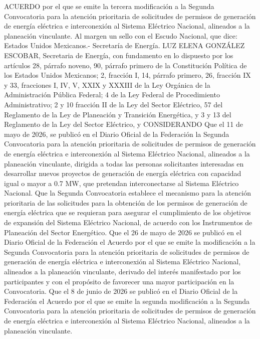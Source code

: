 \begingroup
\senertexto
ACUERDO por el que se emite la tercera modificación a la Segunda Convocatoria para la atención prioritaria de solicitudes de permisos de generación de energía eléctrica e interconexión al Sistema Eléctrico Nacional, alineados a la planeación vinculante.
Al margen un sello con el Escudo Nacional, que dice: Estados Unidos Mexicanos.- Secretaría de Energía.
LUZ ELENA GONZÁLEZ ESCOBAR, Secretaria de Energía, con fundamento en lo dispuesto por los artículos 28, párrafo noveno, 90, párrafo primero de la Constitución Política de los Estados Unidos Mexicanos; 2, fracción I, 14, párrafo primero, 26, fracción IX y 33, fracciones I, IV, V, XXIX y XXXIII de la Ley Orgánica de la Administración Pública Federal; 4 de la Ley Federal de Procedimiento Administrativo; 2 y 10 fracción II de la Ley del Sector Eléctrico, 57 del Reglamento de la Ley de Planeación y Transición Energética, y 3 y 13 del Reglamento de la Ley del Sector Eléctrico, y
CONSIDERANDO
Que el 11 de mayo de 2026, se publicó en el Diario Oficial de la Federación la Segunda Convocatoria para la atención prioritaria de solicitudes de permisos de generación de energía eléctrica e interconexión al Sistema Eléctrico Nacional, alineados a la planeación vinculante, dirigida a todas las personas solicitantes interesadas en desarrollar nuevos proyectos de generación de energía eléctrica con capacidad igual o mayor a 0.7 MW, que pretendan interconectarse al Sistema Eléctrico Nacional.
Que la Segunda Convocatoria establece el mecanismo para la atención prioritaria de las solicitudes para la obtención de los permisos de generación de energía eléctrica que se requieran para asegurar el cumplimiento de los objetivos de expansión del Sistema Eléctrico Nacional, de acuerdo con los Instrumentos de Planeación del Sector Energético.
Que el 26 de mayo de 2026 se publicó en el Diario Oficial de la Federación el Acuerdo por el que se emite la modificación a la Segunda Convocatoria para la atención prioritaria de solicitudes de permisos de generación de energía eléctrica e interconexión al Sistema Eléctrico Nacional, alineados a la planeación vinculante, derivado del interés manifestado por los participantes y con el propósito de favorecer una mayor participación en la Convocatoria.
Que el 8 de junio de 2026 se publicó en el Diario Oficial de la Federación el Acuerdo por el que se emite la segunda modificación a la Segunda Convocatoria para la atención prioritaria de solicitudes de permisos de generación de energía eléctrica e interconexión al Sistema Eléctrico Nacional, alineados a la planeación vinculante.
